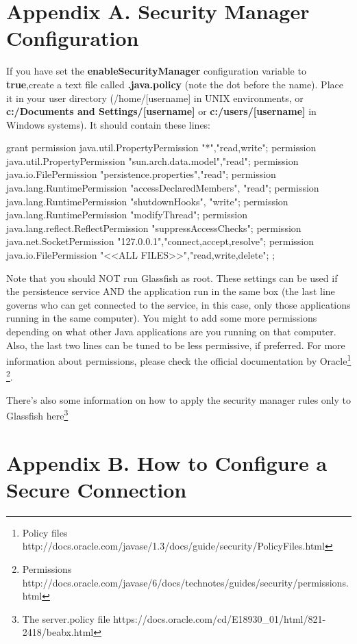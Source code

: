 \documentclass[a4paper]{article}
\begin{document}
		\begin{appendices}
			\appendix
			\section{Appendix A. Security Manager Configuration} \label{app:AppendixA}
			If you have set the \textbf{enableSecurityManager} configuration variable to \textbf{true},create a text file called \textbf{.java.policy} (note the dot before the name). Place it in your user directory (/home/[username] in UNIX environments, or \textbf{c:/Documents and Settings/[username]} or \textbf{c:/users/[username]} in Windows systems). It should contain these lines:
			
			\begin{verbbox}
				grant {
					permission java.util.PropertyPermission "*","read,write";
					permission java.util.PropertyPermission "sun.arch.data.model","read";
					permission java.io.FilePermission "persistence.properties","read";
					permission java.lang.RuntimePermission "accessDeclaredMembers", "read";
					permission java.lang.RuntimePermission "shutdownHooks", "write";
					permission java.lang.RuntimePermission "modifyThread";
					permission java.lang.reflect.ReflectPermission "suppressAccessChecks";
					permission java.net.SocketPermission "127.0.0.1","connect,accept,resolve";
					permission java.io.FilePermission "<<ALL FILES>>","read,write,delete";
				};
			\end{verbbox}
			\begin{figure}[ht]
				\centering	
				\theverbbox
			\end{figure}
			Note that you should NOT run Glassfish as root. These settings can be used if the persistence service AND the application run in the same box (the last line governs who can get connected to the service, in this case, only those applications running in the same computer). You might to add some more permissions depending on what other Java applications are you running on that computer. Also, the last two lines can be tuned to be less permissive, if preferred. For more information about permissions, please check the official documentation by Oracle\footnote{Policy files http://docs.oracle.com/javase/1.3/docs/guide/security/PolicyFiles.html} \footnote{Permissions http://docs.oracle.com/javase/6/docs/technotes/guides/security/permissions.html}.
			
			There's also some information on how to apply the security manager rules only to Glassfish here\footnote{The server.policy file https://docs.oracle.com/cd/E18930\_01/html/821-2418/beabx.html}
			
			\newpage
			\appendix
			\section{Appendix B. How to Configure a Secure Connection} \label{app:AppendixB}
		\end{appendices}
					
\end{document}
